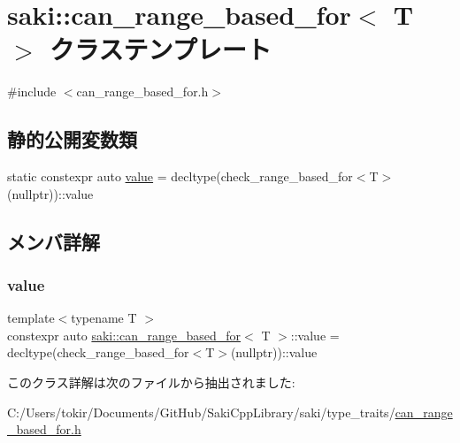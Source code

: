 \hypertarget{classsaki_1_1can__range__based__for}{}\section{saki\+:\+:can\+\_\+range\+\_\+based\+\_\+for$<$ T $>$ クラステンプレート}
\label{classsaki_1_1can__range__based__for}


{\ttfamily \#include $<$can\+\_\+range\+\_\+based\+\_\+for.\+h$>$}

\subsection*{静的公開変数類}
\begin{DoxyCompactItemize}
\item 
static constexpr auto \mbox{\hyperlink{classsaki_1_1can__range__based__for_ad9b48de9333c69be9b613f1ccb6b4f13}{value}} = decltype(check\+\_\+range\+\_\+based\+\_\+for$<$T$>$(nullptr))\+::value
\end{DoxyCompactItemize}


\subsection{メンバ詳解}
\mbox{\label{classsaki_1_1can__range__based__for_ad9b48de9333c69be9b613f1ccb6b4f13}} 
\subsubsection{\texorpdfstring{value}{value}}
{\footnotesize\ttfamily template$<$typename T $>$ \\
constexpr auto \mbox{\hyperlink{classsaki_1_1can__range__based__for}{saki\+::can\+\_\+range\+\_\+based\+\_\+for}}$<$ T $>$\+::value = decltype(check\+\_\+range\+\_\+based\+\_\+for$<$T$>$(nullptr))\+::value\hspace{0.3cm}{\ttfamily [static]}}



このクラス詳解は次のファイルから抽出されました\+:\begin{DoxyCompactItemize}
\item 
C\+:/\+Users/tokir/\+Documents/\+Git\+Hub/\+Saki\+Cpp\+Library/saki/type\+\_\+traits/\mbox{\hyperlink{can__range__based__for_8h}{can\+\_\+range\+\_\+based\+\_\+for.\+h}}\end{DoxyCompactItemize}
